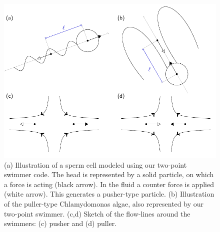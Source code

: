 \documentclass[aip,jcp,reprint,a4paper,onecolumn,amsmath]{revtex4-1}
\begin{document}
\begin{figure}[!htb]
\begin{center}
\includegraphics[scale=1.0]{FIGURES/pusher-puller}
\end{center}
\caption{\label{fig:pusher-puller}(a) Illustration of a sperm cell modeled
using our two-point swimmer code. The head is represented by a solid particle,
on which a force is acting (black arrow). In the fluid a counter force is
applied (white arrow). This generates a pusher-type particle. (b) Illustration
of the puller-type Chlamydomonas algae, also represented by our two-point
swimmer. (c,d) Sketch of the flow-lines around the swimmers: (c) pusher and (d)
puller.}
\end{figure}
\end{document}
